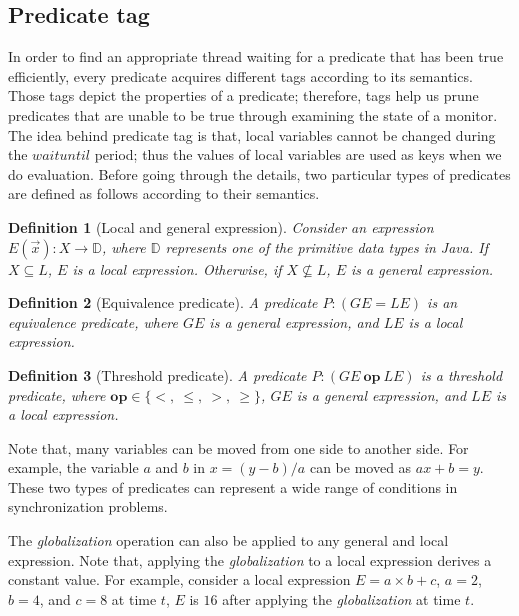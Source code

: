 \documentclass[preprint]{sigplanconf}
\newtheorem{definition}{Definition}
\begin{document}
\subsection{Predicate tag} \label{sec:tag}
In order to find an appropriate thread waiting for a predicate that has been
true efficiently, every predicate acquires different tags according to its 
semantics. Those tags depict the properties of a predicate; therefore, tags
help us prune predicates that are unable to be true through examining the state 
of a monitor. The idea behind predicate tag is that, local variables cannot be
changed during the $waituntil$ period; thus the values of local variables are
used as keys when we do evaluation. Before going through the details, two particular types of 
predicates are defined as follows according to their semantics. 
\begin{definition}[Local and general expression]
    Consider an expression $E(\vec{x}): X \rightarrow \mathbb{D}$, where
    $\mathbb{D}$ represents one of the primitive data types in Java. If $X
    \subseteq L$, $E$ is a local expression. Otherwise, if $X \not\subseteq L$,
    $E$ is a general expression.  
\end{definition}

\begin{definition}[Equivalence predicate]
    A predicate $P: (GE = LE)$ is an equivalence predicate, where $GE$ is a
    general expression, and $LE$ is a local expression.
\end{definition}
\begin{definition}[Threshold predicate]
   A predicate $P: (GE\ \boldsymbol{op}\ LE)$ is a threshold predicate, where 
   $\boldsymbol{op}
    \in \{<,\ \le,\ >,\ \ge\}$, $GE$ is a general expression, and $LE$ is a
    local expression.
\end{definition}
Note that, many variables can be moved from one side to another side. For
example, the variable $a$ and $b$ in $x = (y - b) / a$ can be moved as 
$ax + b = y$. These two types of predicates can represent a wide range of
conditions in synchronization problems. 

The {\em globalization} operation can also be applied to any general and local 
expression. Note that, applying the {\em globalization} to a local expression
derives a constant value. For example, consider a local expression 
$E = a \times b + c$, $a = 2$, $b = 4$, and $c = 8$ at time $t$, $E$ is $16$
after applying the {\em globalization} at time $t$. 
\end{document}

